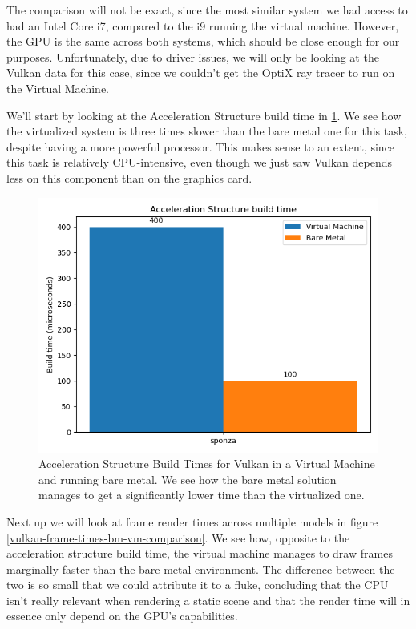The comparison will not be exact, since the most similar system we had access to had an Intel Core i7, compared to the i9 running the virtual machine. However, the GPU is the same across both systems, which should be close enough for our purposes. Unfortunately, due to driver issues, we will only be looking at the Vulkan data for this case, since we couldn't get the OptiX ray tracer to run on the Virtual Machine.

We'll start by looking at the Acceleration Structure build time in \ref{vulkan-accelbuildtime-bm-vm-comparison}. We see how the virtualized system is three times slower than the bare metal one for this task, despite having a more powerful processor. This makes sense to an extent, since this task is relatively CPU-intensive, even though we just saw Vulkan depends less on this component than on the graphics card.

\begin{figure}[hbt!]
    \centering
    \includegraphics[width=1.0\textwidth]{figuras/vulkan-accelbuildtime-baremetal-virtualized-comparison.png}
    \caption{Acceleration Structure Build Times for Vulkan in a Virtual Machine and running bare metal. We see how the bare metal solution manages to get a significantly lower time than the virtualized one.}
    \label{vulkan-accelbuildtime-bm-vm-comparison}
\end{figure}

Next up we will look at frame render times across multiple models in figure \ref{vulkan-frame-times-bm-vm-comparison}. We see how, opposite to the acceleration structure build time, the virtual machine manages to draw frames marginally faster than the bare metal environment. The difference between the two is so small that we could attribute it to a fluke, concluding that the CPU isn't really relevant when rendering a static scene and that the render time will in essence only depend on the GPU's capabilities.

